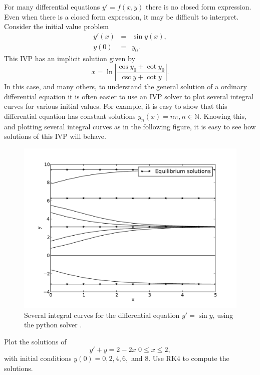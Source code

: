 For many differential equations $y' = f(x,y)$ there is no closed form expression. Even when there is a closed form expression, it may be difficult to interpret. Consider the initial value problem 
\begin{eqnarray*}
y'(x) &=& \sin y(x), \\
y(0) &=& y_0.
\end{eqnarray*}
This IVP has an implicit solution given by 
\[x = \ln \left|\frac{\cos y_0 + \cot y_0}{\csc y + \cot y} \right|.\]
In this case, and many others, to understand the general solution of a ordinary differential equation it is often easier to use an IVP solver to plot several integral curves for various initial values. For example, it is easy to show that this differential equation has constant solutions $y_n(x) = n \pi, n \in \mathbb{N}$. Knowing this, and plotting several integral curves as in the following figure, it is easy to see how solutions of this IVP will behave.


\begin{figure}
\centering
\includegraphics[width=\textwidth]{Fig4.pdf}
\caption{Several integral curves for the differential equation $y' =\sin y$, using the python solver . }
\label{ivp:int_curves}
\end{figure}

\begin{problem}
Plot the solutions of 
\[ y' + y = 2-2x\,\, 0 \leq x \leq 2, \] 
with initial conditions $y(0) = 0, 2, 4, 6, $ and $8$. Use RK4 to compute the solutions. 
\end{problem}



%
%
%
